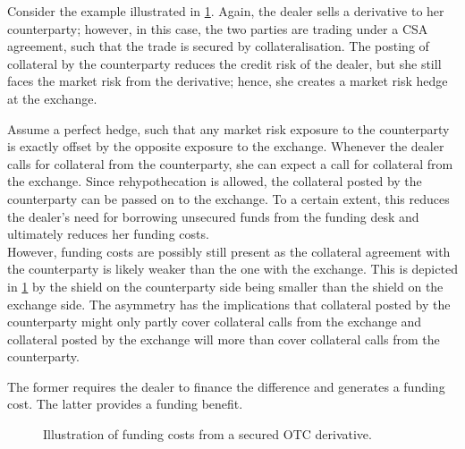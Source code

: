 \documentclass[main.tex]{subfiles}
\begin{document}
        \begin{example}
        Consider the example illustrated in \cref{fig:funding-costs-secured-derivative}.
        Again, the dealer sells a derivative to her counterparty;
        however, in this case, the two parties are trading under a CSA agreement, 
        such that the trade is secured by collateralisation.
        The posting of collateral by the counterparty reduces the credit risk of the dealer,
        but she still faces the market risk from the derivative;
        hence, she creates a market risk hedge at the exchange.
        
        Assume a perfect hedge, such that any market risk exposure to the counterparty 
        is exactly offset by the opposite exposure to the exchange.
        Whenever the dealer calls for collateral from the counterparty,
        she can expect a call for collateral from the exchange.
        Since rehypothecation is allowed,
        the collateral posted by the counterparty can be passed on to the exchange.
        To a certain extent, this reduces the dealer's need for borrowing unsecured funds from the funding desk
        and ultimately reduces her funding costs.
        \\
        However, funding costs are possibly still present as
        the collateral agreement with the counterparty is likely weaker than the one with the exchange. 
        This is depicted in \cref{fig:funding-costs-secured-derivative} 
        by the shield on the counterparty side being smaller than the shield on the exchange side.
        The asymmetry has the implications that 
        collateral posted by the counterparty might only partly cover collateral calls from the exchange 
        and collateral posted by the exchange will more than cover collateral calls from the counterparty.

        The former requires the dealer to finance the difference and generates a funding cost.
        The latter provides a funding benefit.
        \end{example}

        \begin{figure}
            \centering
            \resizebox{\textwidth}{!}{%
            \begin{tikzpicture}
                
            \end{tikzpicture}        
            }   
            \caption{Illustration of funding costs from a secured OTC derivative.}
            \label{fig:funding-costs-secured-derivative}
        \end{figure}
\end{document}

